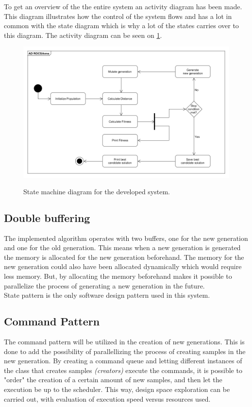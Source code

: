 To get an overview of the the entire system an activity diagram has been made. This diagram illustrates how the control of the system flows and has a lot in common with the state diagram which is why a lot of the states carries over to this diagram. The activity diagram can be seen on \cref{fig:Activity_diagram}.

\begin{figure}[H]
	\centering
	{\includegraphics[width=\textwidth]{Images/AD_ROGSAnne.PNG}}\\[0.5cm]
	\caption{State machine diagram for the developed system.}
	\label{fig:Activity_diagram}
\end{figure}



\subsection{Double buffering}
The implemented algorithm operates with two buffers, one for the new generation and one for the old generation. This means when a new generation is generated the memory is allocated for the new generation beforehand. The memory for the new generation could also have been allocated dynamically which would require less memory. But, by allocating the memory beforehand makes it possible to parallelize the process of generating a new generation in the future.\\   
State pattern is the only software design pattern used in this system. 



\subsection{Command Pattern}
The command pattern will be utilized in the creation of new generations. This is done to add the possibility of parallellizing the process of creating samples in the new generation. By creating a command queue and letting different instances of the class that creates samples \textit{(creators)} execute the commands, it is possible to "order" the creation of a certain amount of new samples, and then let the execution be up to the scheduler. This way, design space exploration can be carried out, with evaluation of execution speed versus resources used.